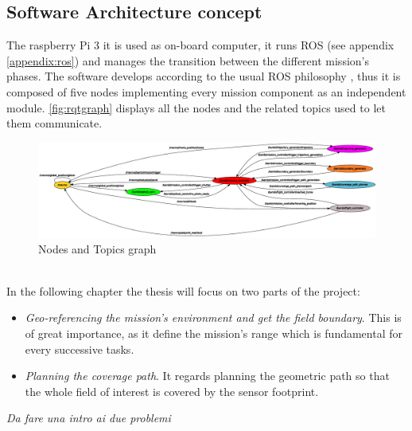  \subsection{Software Architecture concept} %
 \label{sub:software_design}
 The raspberry Pi 3 it is used as on-board computer, it runs ROS (see appendix \ref{appendix:ros}) and manages the transition between the different mission's phases. The software develops according to the usual ROS philosophy \cite{288}, thus it is composed of five nodes implementing every mission component as an independent module. \autoref{fig:rqtgraph} displays all the nodes and the related topics used to let them communicate.
\begin{figure}[ht]
    \centering
    \includegraphics[width=1.4\textwidth, angle=270]{figures/C1/rqtgraph.eps}
    \caption{Nodes and Topics graph}
    \label{fig:rqtgraph}
\end{figure}\\
 In the following chapter the thesis will focus on two parts of the project:
 \begin{itemize}
  	\item \textit{Geo-referencing the mission's environment and get the field boundary}. This is of great importance, as it define the mission's range which is fundamental for every successive tasks.
  	\item \textit{Planning the coverage path}. It regards planning the geometric path so that the whole field of interest is covered by the sensor footprint.
  \end{itemize}

\textit{Da fare una intro ai due problemi}

 



